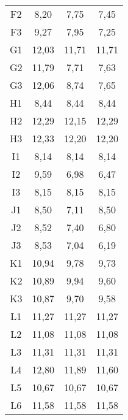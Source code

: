 \begin{center}
\begin{longtable}{cccc}
    F2    & 8,20  & 7,75  & 7,45 \\
    F3    & 9,27  & 7,95  & 7,25 \\
    G1    & 12,03 & 11,71 & 11,71 \\
    G2    & 11,79 & 7,71  & 7,63 \\
    G3    & 12,06 & 8,74  & 7,65 \\
    H1    & 8,44  & 8,44  & 8,44 \\
    H2    & 12,29 & 12,15 & 12,29 \\
    H3    & 12,33 & 12,20 & 12,20 \\
    I1    & 8,14  & 8,14  & 8,14 \\
    I2    & 9,59  & 6,98  & 6,47 \\
    I3    & 8,15  & 8,15  & 8,15 \\
    J1    & 8,50  & 7,11  & 8,50 \\
    J2    & 8,52  & 7,40  & 6,80 \\
    J3    & 8,53  & 7,04  & 6,19 \\
    K1    & 10,94 & 9,78  & 9,73 \\
    K2    & 10,89 & 9,94  & 9,60 \\
    K3    & 10,87 & 9,70  & 9,58 \\
    L1    & 11,27 & 11,27 & 11,27 \\
    L2    & 11,08 & 11,08 & 11,08 \\
    L3    & 11,31 & 11,31 & 11,31 \\
    L4    & 12,80 & 11,89 & 11,60 \\
    L5    & 10,67 & 10,67 & 10,67 \\
    L6    & 11,58 & 11,58 & 11,58 \\


\end{longtable}
\end{center}

